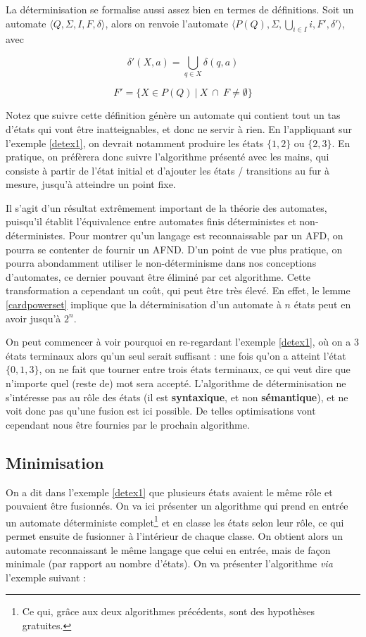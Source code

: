 La déterminisation se formalise aussi assez bien en termes de définitions. Soit un automate $\big \langle Q,\Sigma,I,F,\delta \big \rangle$, alors on renvoie l'automate $\big \langle P(Q),\Sigma,\bigcup_{i \in I} i,F',\delta' \big \rangle$, avec

\[
\delta'(X,a) = \bigcup_{q \in X} \delta(q,a)
\]

\[
F' = \{X \in P(Q) ~|~ X~\cap~F \neq \emptyset\}
\]

Notez que suivre cette définition génère un automate qui contient tout un tas d'états qui vont être inatteignables, et donc ne servir à rien. En l'appliquant sur l'exemple \ref{detex1}, on devrait notamment produire les états $\{1,2\}$ ou $\{2,3\}$. En pratique, on préfèrera donc suivre l'algorithme présenté avec les mains, qui consiste à partir de l'état initial et d'ajouter les états / transitions au fur à mesure, jusqu'à atteindre un point fixe.

Il s'agit d'un résultat extrêmement important de la théorie des automates, puisqu'il établit l'équivalence entre automates finis déterministes et non-déterministes. Pour montrer qu'un langage est reconnaissable par un AFD, on pourra se contenter de fournir un AFND. D'un point de vue plus pratique, on pourra abondamment utiliser le non-déterminisme dans nos conceptions d'automates, ce dernier pouvant être éliminé par cet algorithme. Cette transformation a cependant un coût, qui peut être très élevé. En effet, le lemme \ref{cardpowerset} implique que la déterminisation d'un automate à $n$ états peut en avoir jusqu'à $2^n$.

On peut commencer à voir pourquoi en re-regardant l'exemple \ref{detex1}, où on a 3 états terminaux alors qu'un seul serait suffisant : une fois qu'on a atteint l'état $\{0,1,3\}$, on ne fait que tourner entre trois états terminaux, ce qui veut dire que n'importe quel (reste de) mot sera accepté. L'algorithme de déterminisation ne s'intéresse pas au rôle des états (il est \textbf{syntaxique}, et non \textbf{sémantique}), et ne voit donc pas qu'une fusion est ici possible. De telles optimisations vont cependant nous être fournies par le prochain algorithme.


\subsection{Minimisation}
\label{minim}

On a dit dans l'exemple \ref{detex1} que plusieurs états avaient le même rôle et pouvaient être fusionnés. On va ici présenter un algorithme qui prend en entrée un automate déterministe complet\footnote{Ce qui, grâce aux deux algorithmes précédents, sont des hypothèses gratuites.} et en classe les états selon leur rôle, ce qui permet ensuite de fusionner à l'intérieur de chaque classe. On obtient alors un automate reconnaissant le même langage que celui en entrée, mais de façon minimale (par rapport au nombre d'états). On va présenter l'algorithme \textit{via} l'exemple suivant :


